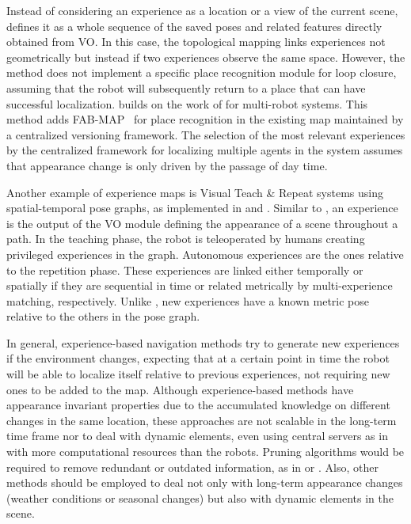 Instead of considering an experience as a location or a view of the current scene, \cite{churchill-newman:2013:0278364913499193} defines it as a whole sequence of the saved poses and related features directly obtained from VO. In this case, the topological mapping links experiences not geometrically but instead if two experiences observe the same space. However, the method does not implement a specific place recognition module for loop closure, assuming that the robot will subsequently return to a place that can have successful localization.
\cite{gadd-newman:2016:7759843} builds on the work of \cite{churchill-newman:2013:0278364913499193} for multi-robot systems. This method adds FAB-MAP~\parencite{discussion:fab-map} for place recognition in the existing map maintained by a centralized versioning framework. The selection of the most relevant experiences by the centralized framework for localizing multiple agents in the system assumes that appearance change is only driven by the passage of day time.

Another example of experience maps is Visual Teach \& Repeat systems using spatial-temporal pose graphs, as implemented in \cite{mactavish-et-al:2018:21838} and \cite{zhang-et-al:2018:8460674}.
Similar to \cite{churchill-newman:2013:0278364913499193}, an experience is the output of the VO module defining the appearance of a scene throughout a path. In the teaching phase, the robot is teleoperated by humans creating privileged experiences in the graph.
Autonomous experiences are the ones relative to the repetition phase. These experiences are linked either temporally or spatially if they are sequential in time or related metrically by multi-experience matching, respectively.
Unlike \cite{churchill-newman:2013:0278364913499193}, new experiences have a known metric pose relative to the others in the pose graph.

In general, experience-based navigation methods try to generate new experiences if the environment changes, expecting that at a certain point in time the robot will be able to localize itself relative to previous experiences, not requiring new ones to be added to the map.
Although experience-based methods have appearance invariant properties due to the accumulated knowledge on different changes in the same location, these approaches are not scalable in the long-term time frame nor to deal with dynamic elements, even using central servers as in \cite{gadd-newman:2016:7759843} with more computational resources than the robots.
Pruning algorithms would be required to remove redundant or outdated information, as in \cite{konolige-bowman:2009:5354121} or \cite{tang-et-al:2019:7}.
Also, other methods should be employed to deal not only with long-term appearance changes (weather conditions or seasonal changes) but also with dynamic elements in the scene.



